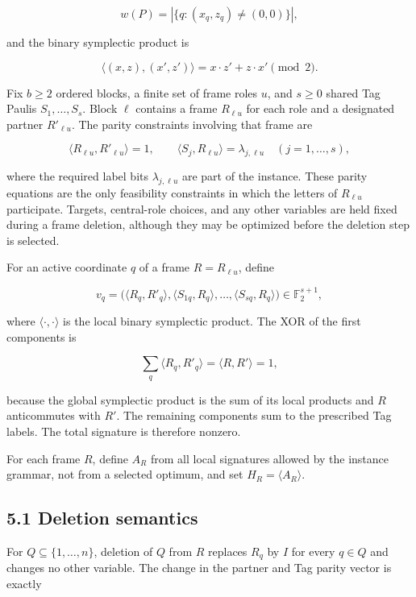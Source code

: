 \documentclass[11pt]{article}
\begin{document}
\[
w(P)=|\{q:(x_q,z_q)\neq(0,0)\}|,
\]

and the binary symplectic product is

\[
\langle (x,z),(x',z')\rangle=x\cdot z'+z\cdot x'\pmod 2.
\]

Fix \(b\geq2\) ordered blocks, a finite set of frame roles \(u\), and \(s\geq0\) shared Tag Paulis \(S_1,\ldots,S_s\). Block \(\ell\) contains a frame \(R_{\ell u}\) for each role and a designated partner \(R'_{\ell u}\). The parity constraints involving that frame are

\[
\langle R_{\ell u},R'_{\ell u}\rangle=1,
\qquad
\langle S_j,R_{\ell u}\rangle=\lambda_{j,\ell u}
\quad (j=1,\ldots,s),
\]

where the required label bits \(\lambda_{j,\ell u}\) are part of the instance. These parity equations are the only feasibility constraints in which the letters of \(R_{\ell u}\) participate. Targets, central-role choices, and any other variables are held fixed during a frame deletion, although they may be optimized before the deletion step is selected.

For an active coordinate \(q\) of a frame \(R=R_{\ell u}\), define

\[
v_q=
\bigl(
\langle R_q,R'_q\rangle,
\langle S_{1q},R_q\rangle,
\ldots,
\langle S_{sq},R_q\rangle
\bigr)
\in \mathbb{F}_2^{s+1},
\]

where \(\langle\cdot,\cdot\rangle\) is the local binary symplectic product. The XOR of the first components is

\[
\sum_q \langle R_q,R'_q\rangle
=
\langle R,R'\rangle
=1,
\]

because the global symplectic product is the sum of its local products and \(R\) anticommutes with \(R'\). The remaining components sum to the prescribed Tag labels. The total signature is therefore nonzero.

For each frame \(R\), define \(A_R\) from all local signatures allowed by the instance grammar, not from a selected optimum, and set \(H_R=\langle A_R\rangle\).

\hypertarget{deletion-semantics}{%
\subsection*{5.1 Deletion semantics}\label{deletion-semantics}}

For \(Q\subseteq\{1,\ldots,n\}\), deletion of \(Q\) from \(R\) replaces \(R_q\) by \(I\) for every \(q\in Q\) and changes no other variable. The change in the partner and Tag parity vector is exactly
\end{document}
